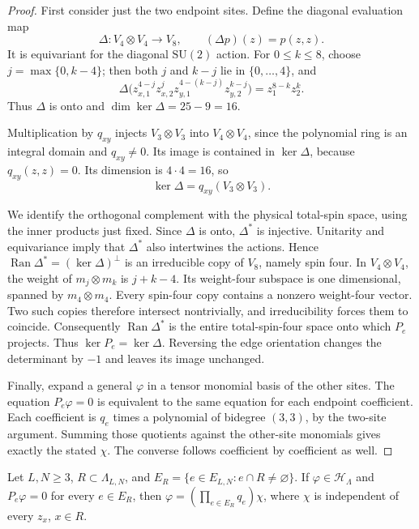 \begin{proof}
First consider just the two endpoint sites. Define the diagonal
evaluation map
\[
 \Delta:V_4\otimes V_4\longrightarrow V_8,\qquad
 (\Delta p)(z)=p(z,z).
\]
It is equivariant for the diagonal \(\mathrm{SU}(2)\) action.
For \(0\le k\le8\), choose \(j=\max\{0,k-4\}\); then both
\(j\) and \(k-j\) lie in \(\{0,\ldots,4\}\), and
\[
 \Delta\bigl(z_{x,1}^{4-j}z_{x,2}^j
              z_{y,1}^{4-(k-j)}z_{y,2}^{k-j}\bigr)
       =z_1^{8-k}z_2^k.
\]
Thus \(\Delta\) is onto and
\(\dim\ker\Delta=25-9=16\).

Multiplication by \(q_{xy}\) injects \(V_3\otimes V_3\) into
\(V_4\otimes V_4\), since the polynomial ring is an integral
domain and \(q_{xy}\ne0\). Its image is contained in
\(\ker\Delta\), because \(q_{xy}(z,z)=0\). Its dimension is
\(4\cdot4=16\), so
\[
 \ker\Delta=q_{xy}(V_3\otimes V_3).
\]

We identify the orthogonal complement with the physical total-spin
space, using the inner products just fixed. Since \(\Delta\) is
onto, \(\Delta^*\) is injective. Unitarity and equivariance imply
that \(\Delta^*\) also intertwines the actions. Hence
\(\operatorname{Ran}\Delta^*=(\ker\Delta)^\perp\) is an
irreducible copy of \(V_8\), namely spin four.
In \(V_4\otimes V_4\), the weight of \(m_j\otimes m_k\) is
\(j+k-4\). Its weight-four subspace is one dimensional, spanned
by \(m_4\otimes m_4\). Every spin-four copy contains a nonzero
weight-four vector. Two such copies therefore intersect nontrivially,
and irreducibility forces them to coincide. Consequently
\(\operatorname{Ran}\Delta^*\) is the entire total-spin-four
space onto which \(P_e\) projects. Thus \(\ker P_e=\ker\Delta\).
Reversing the edge orientation changes the determinant by \(-1\)
and leaves its image unchanged.

Finally, expand a general \(\varphi\) in a tensor monomial basis
of the other sites. The equation \(P_e\varphi=0\) is equivalent
to the same equation for each endpoint coefficient. Each coefficient
is \(q_e\) times a polynomial of bidegree \((3,3)\), by the
two-site argument. Summing those quotients against the other-site
monomials gives exactly the stated \(\chi\). The converse follows
coefficient by coefficient as well.
\end{proof}

\begin{lemma}\label{l:divisibility}
Let \(L,N\ge3\), \(R\subset\Lambda_{L,N}\), and
\(E_R=\{e\in E_{L,N}:e\cap R\ne\varnothing\}\).
If \(\varphi\in\mathcal H_\Lambda\) and \(P_e\varphi=0\)
for every \(e\in E_R\), then
\(\varphi=(\prod_{e\in E_R}q_e)\chi\), where \(\chi\) is independent
of every \(z_x\), \(x\in R\).
\end{lemma}

